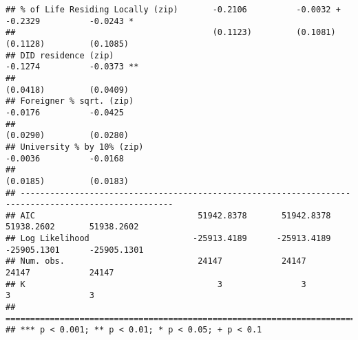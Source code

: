 \documentclass[
]{article}
\begin{document}
\begin{verbatim}
## % of Life Residing Locally (zip)       -0.2106          -0.0032 +        -0.2329          -0.0243 *  
##                                        (0.1123)         (0.1081)         (0.1128)         (0.1085)   
## DID residence (zip)                                                      -0.1274          -0.0373 ** 
##                                                                          (0.0418)         (0.0409)   
## Foreigner % sqrt. (zip)                                                  -0.0176          -0.0425    
##                                                                          (0.0290)         (0.0280)   
## University % by 10% (zip)                                                -0.0036          -0.0168    
##                                                                          (0.0185)         (0.0183)   
## -----------------------------------------------------------------------------------------------------
## AIC                                 51942.8378       51942.8378       51938.2602       51938.2602    
## Log Likelihood                     -25913.4189      -25913.4189      -25905.1301      -25905.1301    
## Num. obs.                           24147            24147            24147            24147         
## K                                       3                3                3                3         
## =====================================================================================================
## *** p < 0.001; ** p < 0.01; * p < 0.05; + p < 0.1
\end{verbatim}
\end{document}
